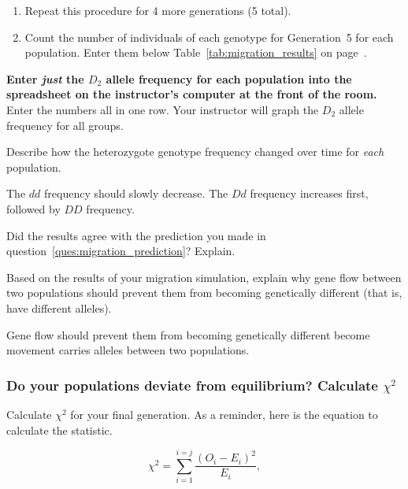 \documentclass[12pt]{exam}
\newcommand*\AnswerBox[2]{%
    \parbox[t][#1]{0.92\textwidth}{%
    \begin{solution}#2\end{solution}}
    \vspace{\stretch{1}}
}
\newlength{\basespace}
\newcommand{\allele}[1]{$#1$}
\begin{document}
\begin{questions}
\begin{enumerate}
	\item Repeat this procedure for 4 more generations (5 total).%
	
	\item Count the number of individuals of each genotype for Generation~5 for each population. Enter them below Table~\ref{tab:migration_results} on page~\pageref{tab:migration_results}. 

\end{enumerate}

\question
\textbf{Enter \emph{just} the \allele{D_2} allele frequency for each population into the spreadsheet on the instructor's
computer at the front of the room.}  Enter the numbers all 
in one row. Your instructor will graph the \allele{D_2} allele frequency for 
all groups.



\question
Describe how the heterozygote genotype frequency changed over time for \emph{each} population.

\AnswerBox{0.5\basespace}{The \allele{dd} frequency should slowly decrease. The \allele{Dd} frequency increases first, followed by \allele{DD} frequency.}

\question
Did the results agree with the prediction you made in question~\ref{ques:migration_prediction}? Explain.

\AnswerBox{0.1\basespace}{%
}

\question[Checkout]
Based on the results of your migration simulation, explain why gene flow between two populations should prevent them from becoming genetically different (that is, have different alleles).

\AnswerBox{4\baselineskip}{Gene flow should prevent them from becoming genetically different become movement carries alleles between two populations.}


\subsubsection*{Do your populations deviate from equilibrium? Calculate $\chi^2$}\label{sec:chi_square}

\question[Checkout] \label{ques:chi-square}
Calculate $\chi^2$ for your final generation. As a reminder, here is the equation to calculate the statistic.

\[\chi^2 = \sum_{i=1}^{i=j}\frac{(O_i - E_i)^2}{E_i}, \]


\end{questions}
\end{document}
